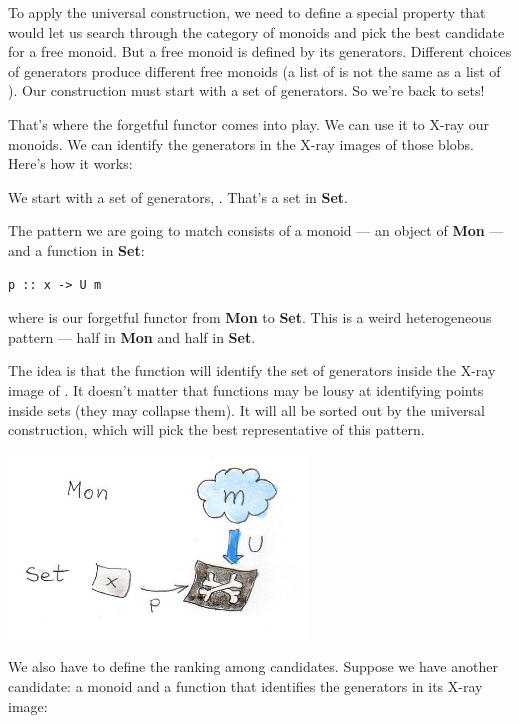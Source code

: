 To apply the universal construction, we need to define a special
property that would let us search through the category of monoids and
pick the best candidate for a free monoid. But a free monoid is defined
by its generators. Different choices of generators produce different
free monoids (a list of  is not the same as a list of
). Our construction must start with a set of generators. So
we're back to sets!

That's where the forgetful functor comes into play. We can use it to
X-ray our monoids. We can identify the generators in the X-ray images of
those blobs. Here's how it works:

We start with a set of generators, . That's a set in
\textbf{Set}.

The pattern we are going to match consists of a monoid  --- an
object of \textbf{Mon} --- and a function  in \textbf{Set}:

\begin{Verbatim}[commandchars=\\\{\}]
p :: x -> U m
\end{Verbatim}

where  is our forgetful functor from \textbf{Mon} to
\textbf{Set}. This is a weird heterogeneous pattern --- half in
\textbf{Mon} and half in \textbf{Set}.

The idea is that the function  will identify the set of
generators inside the X-ray image of . It doesn't matter that
functions may be lousy at identifying points inside sets (they may
collapse them). It will all be sorted out by the universal construction,
which will pick the best representative of this pattern.

\includegraphics[width=3.12500in]{images/monoid-pattern.jpg}

We also have to define the ranking among candidates. Suppose we have
another candidate: a monoid  and a function that identifies
the generators in its X-ray image:

